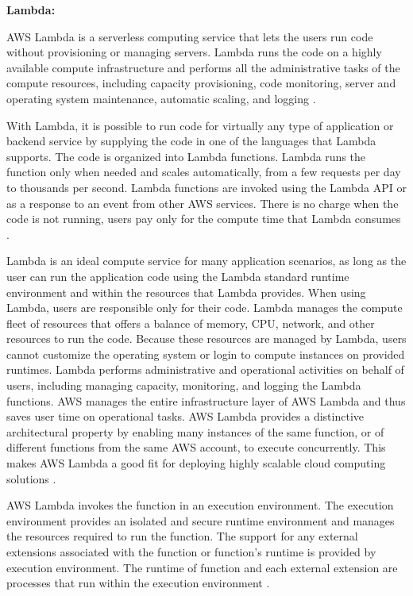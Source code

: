 {\textbf{Lambda:}
\par AWS Lambda is a serverless computing service that lets the users run code without provisioning or managing servers.
Lambda runs the code on a highly available compute infrastructure and performs all the administrative tasks of the compute resources, including capacity provisioning, code monitoring, server and operating system maintenance, automatic scaling, and logging \cite{38}.

\par With Lambda, it is possible to run code for virtually any type of application or backend service by supplying the code in one of the languages that Lambda supports.
The code is organized into Lambda functions.
Lambda runs the function only when needed and scales automatically, from a few requests per day to thousands per second.
Lambda functions are invoked using the Lambda API or as a response to an event from other AWS services.
There is no charge when the code is not running, users pay only for the compute time that Lambda consumes \cite{27}.

\par Lambda is an ideal compute service for many application scenarios, as long as the user can run the application code using the Lambda standard runtime environment and within the resources that Lambda provides.
When using Lambda, users are responsible only for their code.
Lambda manages the compute fleet of resources that offers a balance of memory, CPU, network, and other resources to run the code.
Because these resources are managed by Lambda, users cannot customize the operating system or login to compute instances on provided runtimes.
Lambda performs administrative and operational activities on behalf of users, including managing capacity, monitoring, and logging the Lambda functions.
AWS manages the entire infrastructure layer of AWS Lambda and thus saves user time on operational tasks. AWS Lambda provides a distinctive architectural property by enabling many instances of the same function, or of different functions from the same AWS account, to execute concurrently. This makes AWS Lambda a good fit for deploying highly scalable cloud computing solutions \cite{39}.

\par AWS Lambda invokes the function in an execution environment.
The execution environment provides an isolated and secure runtime environment and manages the resources required to run the function.
The support for any external extensions associated with the function or function's runtime is provided by execution environment.
The runtime of function and each external extension are processes that run within the execution environment \cite{27}.

}
